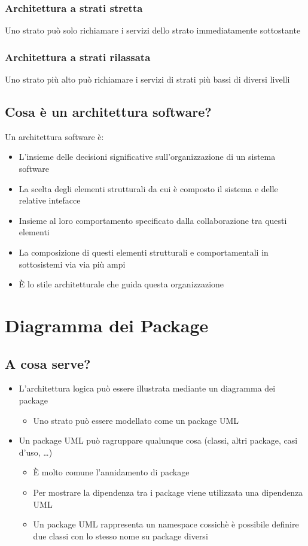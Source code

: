 \subsection{Architettura a strati stretta}
Uno strato può solo richiamare i servizi dello strato immediatamente sottostante
\subsection{Architettura a strati rilassata}
Uno strato più alto può richiamare i servizi di strati più bassi di diversi livelli

\section{Cosa è un architettura software?}
Un architettura software è:
\begin{itemize}
    \item L'insieme delle decisioni significative sull'organizzazione di un sistema software
    \item La scelta degli elementi strutturali da cui è composto il sistema e delle relative intefacce
    \item Insieme al loro comportamento specificato dalla collaborazione tra questi elementi
    \item La composizione di questi elementi strutturali e comportamentali in sottosistemi via via più ampi
    \item È lo stile architetturale che guida questa organizzazione
\end{itemize}

\chapter{Diagramma dei Package}
\section{A cosa serve?}
\begin{itemize}
    \item L'architettura logica può essere illustrata mediante un diagramma dei package 
    \begin{itemize}
        \item Uno strato può essere modellato come un package UML
    \end{itemize}
    \item Un package UML può ragruppare qualunque cosa (classi, altri package, casi d'uso, \dots)
    \begin{itemize}
        \item È molto comune l'annidamento di package
        \item Per mostrare la dipendenza tra i package viene utilizzata una dipendenza UML
        \item Un package UML rappresenta un namespace cossichè è possibile definire due classi con lo stesso nome su package diversi
    \end{itemize}
\end{itemize}

